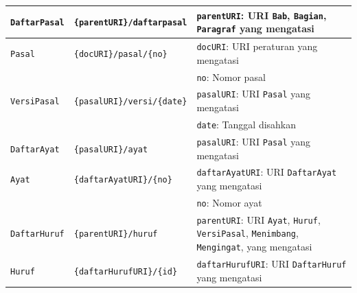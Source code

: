 \begin{longtable}{|p{}|p{}|p{}|}
  \texttt{DaftarPasal}    & \texttt{\{parentURI\}/daftarpasal}    & \texttt{parentURI}: URI \texttt{Bab}, \texttt{Bagian}, \texttt{Paragraf} yang mengatasi                                                                  \\ \hline
  \texttt{Pasal}          & \texttt{\{docURI\}/pasal/\{no\}}      & \texttt{docURI}: URI peraturan yang mengatasi                                                                                                            \\
                          &                                       & \texttt{no}: Nomor pasal                                                                                                                                 \\ \hline
  \texttt{VersiPasal}     & \texttt{\{pasalURI\}/versi/\{date\}}  & \texttt{pasalURI}: URI \texttt{Pasal} yang mengatasi                                                                                                     \\
                          &                                       & \texttt{date}: Tanggal disahkan                                                                                                                          \\ \hline
  \texttt{DaftarAyat}     & \texttt{\{pasalURI\}/ayat}            & \texttt{pasalURI}: URI \texttt{Pasal} yang mengatasi                                                                                                     \\ \hline
  \texttt{Ayat}           & \texttt{\{daftarAyatURI\}/\{no\}}     & \texttt{daftarAyatURI}: URI \texttt{DaftarAyat} yang mengatasi                                                                                           \\
                          &                                       & \texttt{no}: Nomor ayat                                                                                                                                  \\ \hline
  \texttt{DaftarHuruf}    & \texttt{\{parentURI\}/huruf}          & \texttt{parentURI}: URI \texttt{Ayat}, \texttt{Huruf}, \texttt{VersiPasal}, \texttt{Menimbang}, \texttt{Mengingat}, yang mengatasi                       \\ \hline
  \texttt{Huruf}          & \texttt{\{daftarHurufURI\}/\{id\}}    & \texttt{daftarHurufURI}: URI \texttt{DaftarHuruf} yang mengatasi                                                                                         \\

\end{longtable}
